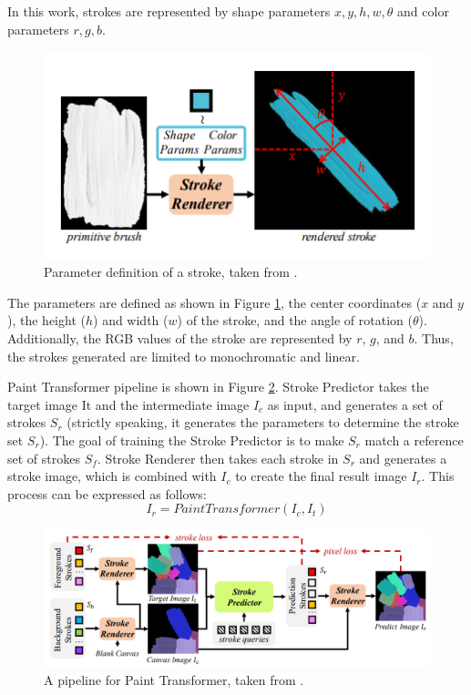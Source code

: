 In this work, strokes are represented by shape parameters ${x, y, h, w, \theta}$ 
and color parameters ${r, g, b}$.
\begin{figure}[h]
    \centering
    \includegraphics[width=110truemm]{resources/3_related_work/stroke-params.png}
    \caption{
        Parameter definition of a stroke,
        taken from \cite{liu2021paint}.
    }
    \label{strokeparams}
\end{figure}
\newline
The parameters are defined as shown in Figure \ref{strokeparams}, the center 
coordinates ($x$ and $y$), the height ($h$) and width ($w$) of the stroke, 
and the angle of rotation ($\theta$). Additionally, the RGB values of the 
stroke are represented by $r$, $g$, and $b$. Thus, the strokes generated are 
limited to monochromatic and linear.

Paint Transformer pipeline is shown in Figure \ref{PTpipeline}.
Stroke Predictor takes the target image It and the intermediate 
image $I_c$ as input, and generates a set of strokes $S_r$
(strictly speaking, it generates the parameters to determine the stroke set $S_r$).
The goal of training the Stroke Predictor is to make $S_r$ match a reference set
of strokes $S_f$. 
Stroke Renderer then takes each stroke in $S_r$ and generates a stroke image, 
which is combined with $I_c$ to create the final result image $I_r$.
This process can be expressed as follows:
\begin{equation}
    \label{painttransformer}
    I_r = PaintTransformer(I_c, I_t)
\end{equation}
\vspace{5mm}
\begin{figure}[t]
    \centering
    \includegraphics[width=135truemm]{resources/3_related_work/PTpipeline.png}
    \caption{
        A pipeline for Paint Transformer,
        taken from \cite{liu2021paint}.
    }
    \label{PTpipeline}
\end{figure}

